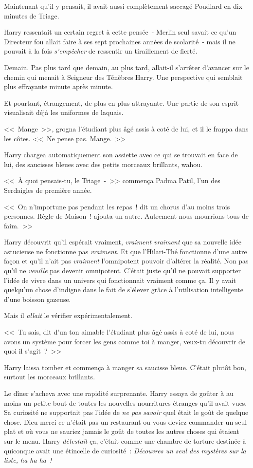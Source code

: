 Maintenant qu'il y pensait, il avait aussi complètement saccagé Poudlard en dix minutes de Triage.

Harry ressentait un certain regret à cette pensée~- Merlin seul savait ce qu'un Directeur fou allait faire à ses sept prochaines années de scolarité~- mais il ne pouvait à la fois \emph{s'empêcher} de ressentir un tiraillement de fierté.

Demain. Pas plus tard que demain, au plus tard, allait-il s'arrêter d'avancer sur le chemin qui menait à Seigneur des Ténèbres Harry. Une perspective qui semblait plus effrayante minute après minute.

Et pourtant, étrangement, de plus en plus attrayante. Une partie de son esprit visualisait déjà les uniformes de laquais.

<<~Mange~>>, grogna l'étudiant plus âgé assis à coté de lui, et il le frappa dans les côtes. <<~Ne pense pas. Mange.~>>

Harry chargea automatiquement son assiette avec ce qui se trouvait en face de lui, des saucisses bleues avec des petits morceaux brillants, wahou.

<<~À quoi pensais-tu, le Triage~-~>> commença Padma Patil, l'un des Serdaigles de première année.

<<~On n'importune pas pendant les repas~! dit un chorus d'au moins trois personnes. Règle de Maison~! ajouta un autre. Autrement nous mourrions tous de faim.~>>

Harry découvrit qu'il espérait vraiment, \emph{vraiment vraiment} que sa nouvelle idée astucieuse ne fonctionne pas \emph{vraiment}. Et que l'Hilari-Thé fonctionne d'une autre façon et qu'il n'ait pas \emph{vraiment} l'omnipotent pouvoir d'altérer la réalité. Non pas qu'il ne \emph{veuille} pas devenir omnipotent. C'était juste qu'il ne pouvait supporter l'idée de vivre dans un univers qui fonctionnait vraiment comme ça. Il y avait quelqu'un chose d'indigne dans le fait de s'élever grâce à l'utilisation intelligente d'une boisson gazeuse.

Mais il \emph{allait} le vérifier expérimentalement.

<<~Tu sais, dit d'un ton aimable l'étudiant plus âgé assis à coté de lui, nous avons un système pour forcer les gens comme toi à manger, veux-tu découvrir de quoi il s'agit~?~>>

Harry laissa tomber et commença à manger sa saucisse bleue. C'était plutôt bon, surtout les morceaux brillants.

Le dîner s'acheva avec une rapidité surprenante. Harry essaya de goûter à au moins un petite bout de toutes les nouvelles nourritures étranges qu'il avait vues. Sa curiosité ne supportait pas l'idée de \emph{ne pas savoir} quel était le goût de quelque chose. Dieu merci ce n'était pas un restaurant ou vous deviez commander un seul plat et où vous ne sauriez jamais le goût de toutes les autres choses qui étaient sur le menu. Harry \emph{détestait} ça, c'était comme une chambre de torture destinée à quiconque avait une étincelle de curiosité~: \emph{Découvres un seul des mystères sur la liste, ha ha ha~!}

